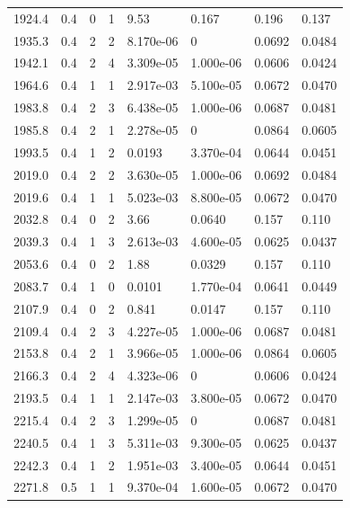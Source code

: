 \documentclass[preview]{standalone}
\begin{document}
{{{{\begin{tabular}{L{1.2cm}C{1.2cm} C{0.3cm}C{0.5cm} C{1.4cm}C{1.4cm} C{1.4cm}C{1.4cm}}
  1924.4  &   0.4  & 0     &  1 &  9.53  & 0.167  & 0.196 &  0.137   \\ 
  1935.3  &   0.4  & 2     &  2 &  8.170e-06  & 0  & 0.0692 &  0.0484   \\ 
  1942.1  &   0.4  & 2     &  4 &  3.309e-05  & 1.000e-06  & 0.0606 &  0.0424   \\ 
  1964.6  &   0.4  & 1     &  1 &  2.917e-03  & 5.100e-05  & 0.0672 &  0.0470   \\ 
  1983.8  &   0.4  & 2     &  3 &  6.438e-05  & 1.000e-06  & 0.0687 &  0.0481   \\ 
  1985.8  &   0.4  & 2     &  1 &  2.278e-05  & 0  & 0.0864 &  0.0605   \\ 
  1993.5  &   0.4  & 1     &  2 &  0.0193  & 3.370e-04  & 0.0644 &  0.0451   \\ 
  2019.0  &   0.4  & 2     &  2 &  3.630e-05  & 1.000e-06  & 0.0692 &  0.0484   \\ 
  2019.6  &   0.4  & 1     &  1 &  5.023e-03  & 8.800e-05  & 0.0672 &  0.0470   \\ 
  2032.8  &   0.4  & 0     &  2 &  3.66  & 0.0640  & 0.157 &  0.110   \\ 
  2039.3  &   0.4  & 1     &  3 &  2.613e-03  & 4.600e-05  & 0.0625 &  0.0437   \\ 
  2053.6  &   0.4  & 0     &  2 &  1.88  & 0.0329  & 0.157 &  0.110   \\ 
  2083.7  &   0.4  & 1     &  0 &  0.0101  & 1.770e-04  & 0.0641 &  0.0449   \\ 
  2107.9  &   0.4  & 0     &  2 &  0.841  & 0.0147  & 0.157 &  0.110   \\ 
  2109.4  &   0.4  & 2     &  3 &  4.227e-05  & 1.000e-06  & 0.0687 &  0.0481   \\ 
  2153.8  &   0.4  & 2     &  1 &  3.966e-05  & 1.000e-06  & 0.0864 &  0.0605   \\ 
  2166.3  &   0.4  & 2     &  4 &  4.323e-06  & 0  & 0.0606 &  0.0424   \\ 
  2193.5  &   0.4  & 1     &  1 &  2.147e-03  & 3.800e-05  & 0.0672 &  0.0470   \\ 
  2215.4  &   0.4  & 2     &  3 &  1.299e-05  & 0  & 0.0687 &  0.0481   \\ 
  2240.5  &   0.4  & 1     &  3 &  5.311e-03  & 9.300e-05  & 0.0625 &  0.0437   \\ 
  2242.3  &   0.4  & 1     &  2 &  1.951e-03  & 3.400e-05  & 0.0644 &  0.0451   \\ 
  2271.8  &   0.5  & 1     &  1 &  9.370e-04  & 1.600e-05  & 0.0672 &  0.0470   \\ 

\end{tabular}}}}}
\end{document}
